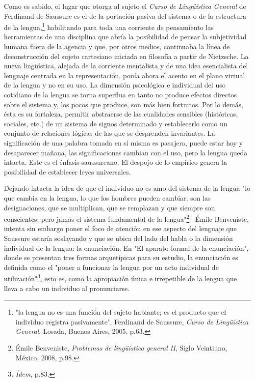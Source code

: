 Como es sabido, el lugar que otorga al sujeto el \emph{Curso de
Lingüística General} de Ferdinand de Saussure es el de la portación
pasiva del sistema o de la estructura de la lengua,\footnote{"la lengua
  no es una función del sujeto hablante; es el producto que el individuo
  registra pasivamente", Ferdinand de Saussure, \emph{Curso de
  Lingüística General}, Losada, Buenos Aires, 2005, p.63.} habilitando
para toda una corriente de pensamiento las herramientas de una
disciplina que abría la posibilidad de pensar la subjetividad humana
fuera de la agencia y que, por otros medios, continuaba la línea de
deconstrucción del sujeto cartesiano iniciada en filosofía a partir de
Nietzsche. La nueva lingüística, alejada de la corriente mentalista y de
una idea esencialista del lenguaje centrada en la representación, ponía
ahora el acento en el plano virtual de la lengua y no en su uso. La
dimensión psicológica e individual del uso cotidiano de la lengua se
torna superflua en tanto no produce efectos directos sobre el sistema y,
los pocos que produce, son más bien fortuitos. Por lo demás, ésta es su
fortaleza, permitir abstraerse de las cualidades sensibles (históricas,
sociales, etc.) de un sistema de signos determinado y establecerlo como
un conjunto de relaciones lógicas de las que se desprenden invariantes.
La significación de una palabra tomada en sí misma es pasajera, puede
estar hoy y desaparecer mañana, las significaciones cambian con el uso,
pero la lengua queda intacta. Este es el énfasis saussureano. El despojo
de lo empírico genera la posibilidad de establecer leyes universales.

Dejando intacta la idea de que el individuo no es amo del sistema de la
lengua "lo que cambia en la lengua, lo que los hombres pueden cambiar,
son las designaciones, que se multiplican, que se remplazan y que
siempre son conscientes, pero jamás el sistema fundamental de la
lengua"\footnote{Émile Benveniste, \emph{Problemas de lingüística
  general II}, Siglo Veintiuno, México, 2008, p.98.}-- Émile Benveniste,
intenta sin embargo poner el foco de atención en ese aspecto del
lenguaje que Saussure estaría soslayando y que se ubica del lado del
habla o la dimensión individual de la lengua: la enunciación. En "El
aparato formal de la enunciación", donde se presentan tres formas
arquetípicas para su estudio, la enunciación es definida como el "poner
a funcionar la lengua por un acto individual de utilización"\footnote{\emph{Ídem},
  p.83.}, esto es, como la apropiación única e irrepetible de la lengua
que lleva a cabo un individuo al pronunciarse.

